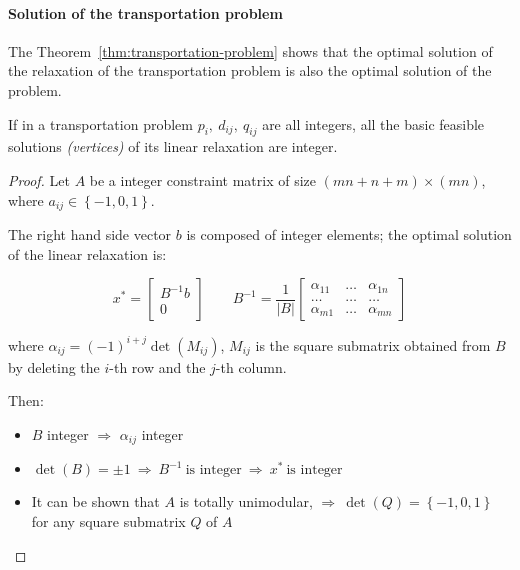 \documentclass[english]{article}
\begin{document}
\paragraph{Solution of the transportation problem}

The Theorem~\ref{thm:transportation-problem} shows that the optimal solution of the \LP relaxation of the transportation problem is also the optimal solution of the \ILP problem.

\begin{theorem}
  \label{thm:transportation-problem}
  If in a transportation problem \(p_i, \ d_{ij}, \ q_{ij}\) are all integers, all the basic feasible solutions \textit{(vertices)} of its linear relaxation are integer.
\end{theorem}

\begin{proof}
  Let \(A\) be a integer constraint matrix of size \(\left( mn + n + m \right) \times \left( mn \right)\), where \(a_{ij} \in \left\{ -1, 0, 1 \right\}\).

  The right hand side vector \(b\) is composed of integer elements;
  the optimal solution of the linear relaxation is:

  \[ x^\ast = \begin{bmatrix}
      B^{-1} b \\ 0

    \end{bmatrix}
    \qquad
    B^{-1} = \dfrac{1}{|B|}
    \begin{bmatrix}
      \alpha_{11} & \dots  & \alpha_{1n} \\
      \ldots      & \ldots & \ldots      \\
      \alpha_{m1} & \dots  & \alpha_{mn}
    \end{bmatrix}
  \]

  where \(\alpha_{ij} = (-1)^{i+j} \det\left( M_{ij} \right)\), \(M_{ij}\) is the square submatrix obtained from \(B\) by deleting the \(i\)-th row and the \(j\)-th column.

  Then:
  \begin{itemize}
    \item \(B\) integer \(\Rightarrow\) \(\alpha_{ij}\) integer
    \item \(\det\left( B \right) = \pm 1 \ \Rightarrow \ B^{-1} \ \text{is integer} \ \Rightarrow \ x^\ast \ \text{is integer}\)
    \item It can be shown that \(A\) is totally unimodular, \(\Rightarrow \ \det\left( Q \right) = \left\{ -1, 0, 1 \right\}\) for any square submatrix \(Q\) of \(A\)
  \end{itemize}
\end{proof}
\end{document}

